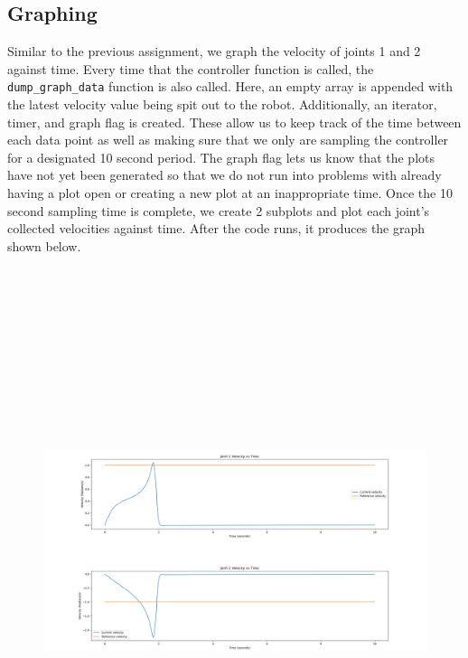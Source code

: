 \documentclass{article}
\begin{document}
\subsection{Graphing}
\vspace{0.15in}
Similar to the previous assignment, we graph the velocity of 
joints 1 and 2 against time. Every time that the controller 
function is called, the \lstinline{dump_graph_data} function is also called. 
Here, an empty array is appended with the latest velocity value 
being spit out to the robot. Additionally, an iterator, 
timer, and graph flag is created. These allow us to keep 
track of the time between each data point as well as making 
sure that we only are sampling the controller for a designated 
10 second period. The graph flag lets us know that the plots 
have not yet been generated so that we do not run into problems 
with already having a plot open or creating a new plot at an 
inappropriate time. Once the 10 second sampling time is 
complete, we create 2 subplots and plot each 
joint's collected velocities against time. After the code runs,
it produces the graph shown below.
\begin{figure}[h]
    \includegraphics[width=8.5in, height=6.5in, center]{part3_graph5.png}
\end{figure}
\end{document}
